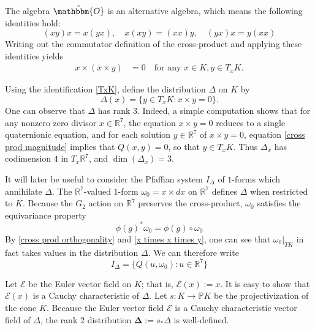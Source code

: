 \documentclass[11pt,letterpaper]{amsart}
\numberwithin{equation}{section}
\newcommand{\oct}{\hat{\mathbbm{O}}}
\begin{document}
The algebra $\oct$ is an alternative algebra, which means the following identities hold:
\begin{equation}
    (xy)x = x(yx),\quad x(xy) = (xx)y, \quad (yx)x = y(xx)
\end{equation}
Writing out the commutator definition of the cross-product and applying these identities yields
\begin{align}
\label{x times x times y}
    x\times (x\times y) &= 0 \quad\text{for any }x\in K, y\in T_xK.
\end{align}

Using the identification \eqref{TxK}, define the distribution $\Delta$ on $K$ by
\begin{equation}
\label{def Delta}
    \Delta(x) = \{y \in T_xK : x\times y=0\}.
\end{equation}
One can observe that $\Delta$ has rank $3$. Indeed, a simple computation shows that for any nonzero zero divisor $x\in \mathbb{R}^7$, the equation $x\times y = 0$ reduces to a single quaternionic equation, and for each solution $y\in \mathbb{R}^7$ of $x\times y=0$, equation \eqref{cross prod magnitude} implies that $Q(x,y)=0$, so that $y\in T_xK$. Thus $\Delta_x$ has codimension $4$ in $T_x\mathbb{R}^7$, and $\dim(\Delta_x)=3$.

It will later be useful to consider the Pfaffian system $I_\Delta$ of $1$-forms which annihilate $\Delta$. The $\mathbb{R}^7$-valued $1$-form $\omega_0 = x\times dx$ on $\mathbb{R}^7$ defines $\Delta$ when restricted to $K$. Because the $G_2$ action on $\mathbb{R}^7$ preserves the cross-product, $\omega_0$ satisfies the equivariance property 
\begin{equation}
    \label{omega_0 equivar}
    \phi(g)^*\omega_0 = \phi(g)\circ \omega_0
\end{equation}
By \eqref{cross prod orthogonality} and \eqref{x times x times y}, one can see that $\omega_0|_{TK}$ in fact takes values in the distribution $\Delta$. We can therefore write
\begin{equation}
    \label{def: I Delta}
    I_\Delta =  \{Q(u,\omega_0): u\in \mathbb{R}^7\} 
\end{equation}

Let $\mathcal{E}$ be the Euler vector field on $K$; that is, $\mathcal{E}(x) := x$. It is easy to show that $\mathcal{E}(x)$ is a Cauchy characteristic of $\Delta.$ Let $s:K\to \mathbb{P}K$ be the projectivization of the cone $K$. Because the Euler vector field $\mathcal{E}$ is a Cauchy characteristic vector field of $\Delta$, the rank $2$ distribution $\boldsymbol{\Delta}:=s_*\Delta$ is well-defined.
\end{document}
